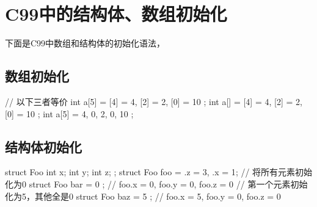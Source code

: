 ﻿\section[Initialize struct and array in C99]{C99中的结构体、数组初始化}
下面是C99中数组和结构体的初始化语法，

\subsection[Initialize array]{数组初始化}
\begin{cppcode}
  // 以下三者等价
  int a[5] = { [4] = 4, [2] = 2, [0] = 10 };
  int a[]  = { [4] = 4, [2] = 2, [0] = 10 };
  int a[5] = { 4, 0, 2, 0, 10 };
\end{cppcode}

\subsection[Initialzie struct]{结构体初始化}
\begin{cppcode}
  struct Foo {
    int x;
    int y;
    int z;
  };
  struct Foo foo = {.z = 3, .x = 1};
  // 将所有元素初始化为0
  struct Foo bar = { 0 }; // foo.x = 0, foo.y = 0, foo.z = 0
  // 第一个元素初始化为5，其他全是0
  struct Foo baz = { 5 }; // foo.x = 5, foo.y = 0, foo.z = 0
\end{cppcode}